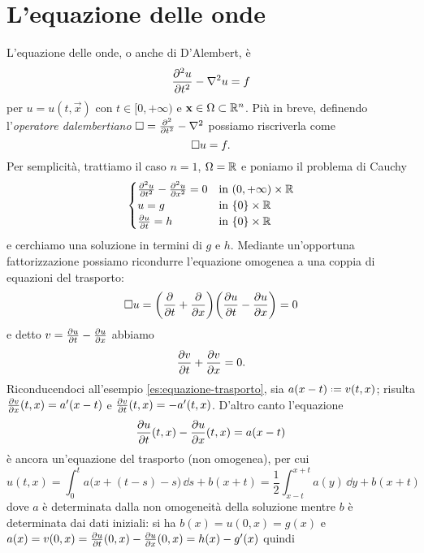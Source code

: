 \chapter{L'equazione delle onde}
\label{ch:onde}

L'equazione delle onde, o anche di D'Alembert, è
\begin{equation}
    \frac{\partial^2 {u}}{\partial {t}^2}-\nabla^2 u=f
    \label{eq:onde}
\end{equation}
per $u=u(t,\vec x)$ con $t\in[0,+\infty)$ e $\mathbf{x}\in\Omega\subset\mathbb{R}^n$.
Più in breve, definendo l'\emph{operatore dalembertiano} $\square=\frac{\partial^2 {}}{\partial {t}^2}-\nabla^2$ possiamo riscriverla come
\begin{equation}
    \square u=f.
    \label{eq:onde-dalembertiano}
\end{equation}
Per semplicità, trattiamo il caso $n=1$, $\Omega=\mathbb{R}$ e poniamo il problema di Cauchy
\begin{equation}
    \begin{cases}
        \frac{\partial^2 {u}}{\partial {t}^2}-\frac{\partial^2 {u}}{\partial {x}^2}=0 & \text{in }(0,+\infty)\times\mathbb{R}\\
        u=g                       & \text{in }\{0\}\times\mathbb{R}\\
        \frac{\partial {u}}{\partial {t}}=h              & \text{in }\{0\}\times\mathbb{R}
    \end{cases}
    \label{eq:problema-cauchy-onde}
\end{equation}
e cerchiamo una soluzione in termini di $g$ e $h$.
Mediante un'opportuna fattorizzazione possiamo ricondurre l'equazione omogenea a una coppia di equazioni del trasporto:
\begin{equation}
    \square u=\biggl(\frac{\partial {}}{\partial {t}}+\frac{\partial {}}{\partial {x}}\biggr)\biggl(\frac{\partial {u}}{\partial {t}}-\frac{\partial {u}}{\partial {x}}\biggr)=0
\end{equation}
e detto $v=\frac{\partial {u}}{\partial {t}}-\frac{\partial {u}}{\partial {x}}$ abbiamo
\begin{equation}
    \frac{\partial {v}}{\partial {t}}+\frac{\partial {v}}{\partial {x}}=0.
\end{equation}
Riconducendoci all'esempio \ref{es:equazione-trasporto}, sia $a(x-t)\defeq v(t,x)$; risulta $\frac{\partial {v}}{\partial {x}}(t,x)=a'(x-t)$ e $\frac{\partial {v}}{\partial {t}}(t,x)=-a'(t,x)$.
D'altro canto l'equazione
\begin{equation}
    \frac{\partial {u}}{\partial {t}}(t,x)-\frac{\partial {u}}{\partial {x}}(t,x)=a(x-t)
\end{equation}
è ancora un'equazione del trasporto (non omogenea), per cui
\begin{equation}
    u(t,x)=
    \int_0^ta\bigl(x+(t-s)-s)\,\dd s+b(x+t)=
    \frac12\int_{x-t}^{x+t}a(y)\,\dd y+b(x+t)
\end{equation}
dove $a$ è determinata dalla non omogeneità della soluzione mentre $b$ è determinata dai dati iniziali: si ha $b(x)=u(0,x)=g(x)$ e $a(x)=v(0,x)=\frac{\partial {u}}{\partial {t}}(0,x)-\frac{\partial {u}}{\partial {x}}(0,x)=h(x)-g'(x)$ quindi
